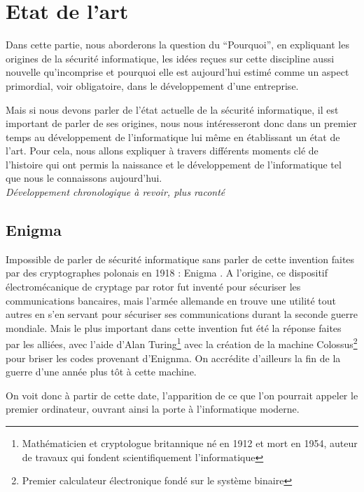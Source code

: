 \documentclass[a4paper]{memoir}
\begin{document}
\chapter{Etat de l'art}%

Dans cette partie, nous aborderons la question du ``Pourquoi'', en expliquant les origines de la sécurité informatique, les idées reçues sur cette discipline aussi nouvelle qu'incomprise et pourquoi elle est aujourd'hui estimé comme un aspect primordial, voir obligatoire, dans le développement d'une entreprise.

\noindent Mais si nous devons parler de l'état actuelle de la sécurité informatique, il est important de parler de ses origines, nous nous intéresseront donc dans un premier temps au développement de l'informatique lui même en établissant un état de l'art. Pour cela, nous allons expliquer à travers différents moments clé de l'histoire qui ont permis la naissance et le développement de l'informatique tel que nous le connaissons aujourd'hui.\\

\textit{Développement chronologique à revoir, plus raconté}


\section{Enigma}

Impossible de parler de sécurité informatique sans parler de cette invention faites par des cryptographes polonais en 1918 : Enigma .
A l'origine, ce dispositif électromécanique de cryptage par rotor fut inventé pour sécuriser les communications bancaires, mais l'armée allemande en trouve une utilité tout autres en s'en servant pour sécuriser ses communications durant la seconde guerre mondiale. Mais le plus important dans cette invention fut été la réponse faites par les alliées, avec l'aide d'Alan Turing\footnote{Mathématicien et cryptologue britannique né en 1912 et mort en 1954, auteur de travaux qui fondent scientifiquement l'informatique} avec la création de la machine Colossus\footnote{Premier calculateur électronique fondé sur le système binaire} pour briser les codes provenant d'Enignma. On accrédite d'ailleurs la fin de la guerre d'une année plus tôt à cette machine.

On voit donc à partir de cette date, l'apparition de ce que l'on pourrait appeler le premier ordinateur, ouvrant ainsi la porte à l'informatique moderne.
\end{document}
